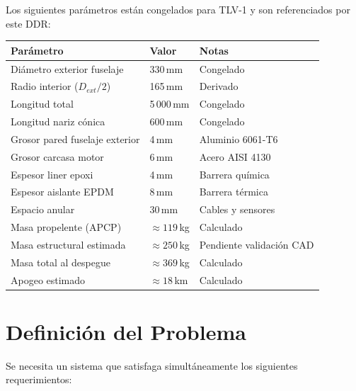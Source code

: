 \documentclass[11pt, a4paper]{article}
\begin{document}
Los siguientes parámetros están congelados para TLV-1 y son referenciados por este DDR:

\vspace{6pt}
\begin{tabularx}{\linewidth}{llX}
  \toprule
  \rowcolor{tlvnavy}
  \color{white}\textbf{Parámetro} & \color{white}\textbf{Valor} & \color{white}\textbf{Notas} \\
  \midrule
  \rowcolor{tlvlight} Diámetro exterior fuselaje   & 330\,mm   & Congelado \\
  Radio interior ($D_{ext}/2$)                     & 165\,mm   & Derivado \\
  \rowcolor{tlvlight} Longitud total               & 5\,000\,mm & Congelado \\
  Longitud nariz cónica                            & 600\,mm   & Congelado \\
  \rowcolor{tlvlight} Grosor pared fuselaje exterior & 4\,mm   & Aluminio 6061-T6 \\
  Grosor carcasa motor                             & 6\,mm     & Acero AISI 4130 \\
  \rowcolor{tlvlight} Espesor liner epoxi          & 4\,mm     & Barrera química \\
  Espesor aislante EPDM                            & 8\,mm     & Barrera térmica \\
  \rowcolor{tlvlight} Espacio anular               & 30\,mm    & Cables y sensores \\
  Masa propelente (APCP)                           & $\approx 119$\,kg & Calculado \\
  \rowcolor{tlvlight} Masa estructural estimada    & $\approx 250$\,kg & Pendiente validación CAD \\
  Masa total al despegue                           & $\approx 369$\,kg & Calculado \\
  \rowcolor{tlvlight} Apogeo estimado              & $\approx 18$\,km  & Calculado \\
  \bottomrule
\end{tabularx}

\section{Definición del Problema}

Se necesita un sistema que satisfaga simultáneamente los siguientes requerimientos:
\end{document}
